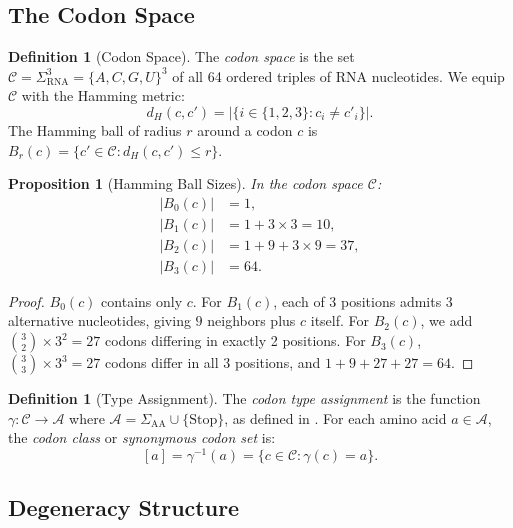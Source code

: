 \documentclass[12pt,a4paper]{article}
\newtheorem{proposition}[theorem]{Proposition}
\theoremstyle{definition}
\newtheorem{definition}[theorem]{Definition}
\begin{document}
\subsection{The Codon Space}

\begin{definition}[Codon Space]\label{def:codon-space}
The \emph{codon space} is the set $\mathcal{C} = \Sigma_\mathrm{RNA}^3 = \{A, C, G, U\}^3$ of all 64 ordered triples of RNA nucleotides. We equip $\mathcal{C}$ with the Hamming metric:
\[
  d_H(c, c') = |\{i \in \{1,2,3\} : c_i \neq c'_i\}|.
\]
The Hamming ball of radius $r$ around a codon $c$ is $B_r(c) = \{c' \in \mathcal{C} : d_H(c, c') \leq r\}$.
\end{definition}

\begin{proposition}[Hamming Ball Sizes]\label{prop:hamming-balls}
In the codon space $\mathcal{C}$:
\begin{align}
  |B_0(c)| &= 1, \\
  |B_1(c)| &= 1 + 3 \times 3 = 10, \\
  |B_2(c)| &= 1 + 9 + 3 \times 9 = 37, \\
  |B_3(c)| &= 64.
\end{align}
\end{proposition}

\begin{proof}
$B_0(c)$ contains only $c$. For $B_1(c)$, each of 3 positions admits 3 alternative nucleotides, giving $9$ neighbors plus $c$ itself. For $B_2(c)$, we add $\binom{3}{2} \times 3^2 = 27$ codons differing in exactly 2 positions. For $B_3(c)$, $\binom{3}{3} \times 3^3 = 27$ codons differ in all 3 positions, and $1 + 9 + 27 + 27 = 64$.
\end{proof}

\begin{definition}[Type Assignment]\label{def:type-assignment}
The \emph{codon type assignment} is the function $\gamma \colon \mathcal{C} \to \mathcal{A}$ where $\mathcal{A} = \Sigma_\mathrm{AA} \cup \{\text{Stop}\}$, as defined in . For each amino acid $a \in \mathcal{A}$, the \emph{codon class} or \emph{synonymous codon set} is:
\[
  [a] = \gamma^{-1}(a) = \{c \in \mathcal{C} : \gamma(c) = a\}.
\]
\end{definition}

\subsection{Degeneracy Structure}
\end{document}
